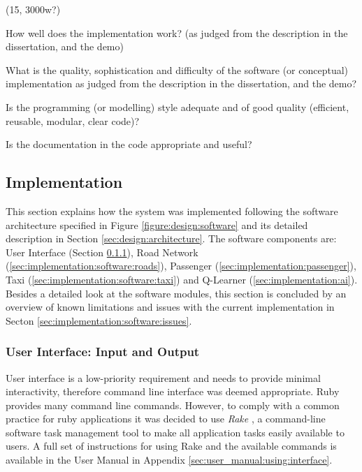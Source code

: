 
(15, 3000w?)

How well does the implementation work? (as judged from the description in the
dissertation, and the demo)

What is the quality, sophistication and difficulty of the software (or
conceptual) implementation as judged from the description in the dissertation,
and the demo?

Is the programming (or modelling) style adequate and of good quality
(efficient, reusable, modular, clear code)?

Is the documentation in the code appropriate and useful?


\subsection{Implementation}
\label{sec:implementation:software}

This section explains how the system was implemented following the software
architecture specified in Figure \ref{figure:design:software} and its detailed
description in Section \ref{sec:design:architecture}. The software components
are: User Interface (Section \ref{sec:implementation:software:ui}), Road
Network (\ref{sec:implementation:software:roads}), Passenger
(\ref{sec:implementation:passenger}), Taxi
(\ref{sec:implementation:software:taxi}) and Q-Learner
(\ref{sec:implementation:ai}). Besides a detailed look at the software modules,
this section is concluded by an overview of known limitations and issues with
the current implementation in Secton \ref{sec:implementation:software:issues}.


\subsubsection{User Interface: Input and Output}
\label{sec:implementation:software:ui}

User interface is a low-priority requirement and needs to provide minimal
interactivity, therefore command line interface was deemed appropriate. Ruby
provides many command line commands. However, to comply with a common practice
for ruby applications it was decided to use \textit{Rake} \parencite{Rake}, a
command-line software task management tool to make all application tasks easily
available to users. A full set of instructions for using Rake and the available
commands is available in the User Manual in Appendix
\ref{sec:user_manual:using:interface}.

